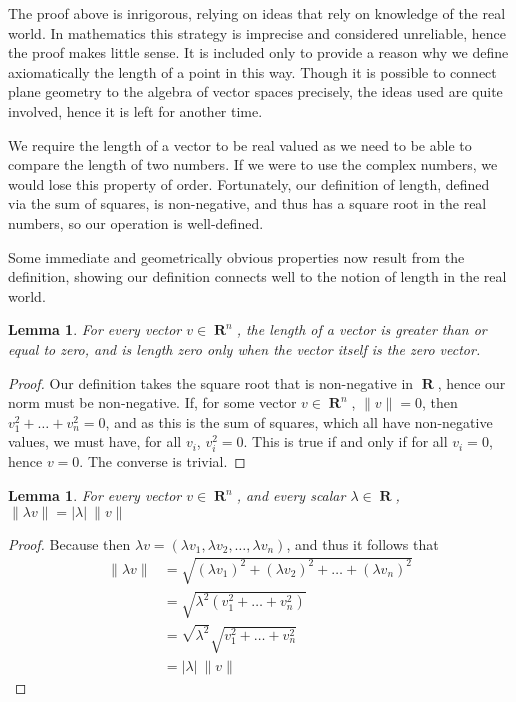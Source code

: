 \documentclass{report}
\newtheorem{lemma}[theorem]{Lemma}
\DeclareMathOperator{\real}{\mathbf{R}}
\begin{document}
The proof above is inrigorous, relying on ideas that rely on knowledge of the real world. In mathematics this strategy is imprecise and considered unreliable, hence the proof makes little sense. It is included only to provide a reason why we define axiomatically the length of a point in this way. Though it is possible to connect plane geometry to the algebra of vector spaces precisely, the ideas used are quite involved, hence it is left for another time.

We require the length of a vector to be real valued as we need to be able to compare the length of two numbers. If we were to use the complex numbers, we would lose this property of order. Fortunately, our definition of length, defined via the sum of squares, is non-negative, and thus has a square root in the real numbers, so our operation is well-defined.

Some immediate and geometrically obvious properties now result from the definition, showing our definition connects well to the notion of length in the real world.

\begin{lemma}
  For every vector $v \in \real^n$, the length of a vector is greater than or equal to zero, and is length zero only when the vector itself is the zero vector.
\end{lemma}
\begin{proof}
  Our definition takes the square root that is non-negative in $\real$, hence our norm must be non-negative. If, for some vector $v \in \real^n$, $\| v \| = 0$, then $v_1^2 + \dots + v_n^2 = 0$, and as this is the sum of squares, which all have non-negative values, we must have, for all $v_i$, $v_i^2 = 0$. This is true if and only if for all $v_i = 0$, hence $v = 0$. The converse is trivial.
\end{proof}

\begin{lemma}
  For every vector $v \in \real^n$, and every scalar $\lambda \in \real$, $\| \lambda v \| = | \lambda |\ \| v \|$
\end{lemma}
\begin{proof}
  Because then $\lambda v = (\lambda v_1, \lambda v_2, \dots, \lambda v_n)$, and thus it follows that
  \begin{align*}
    \| \lambda v \| &= \sqrt{(\lambda v_1)^2 + (\lambda v_2)^2 + \dots + (\lambda v_n)^2}\\
                    &= \sqrt{\lambda^2(v_1^2 + \dots + v_n^2)}\\
                    &= \sqrt{\lambda^2} \sqrt{v_1^2 + \dots + v_n^2}\\
                    &= | \lambda |\ \| v \|
  \end{align*}
\end{proof}
\end{document}
